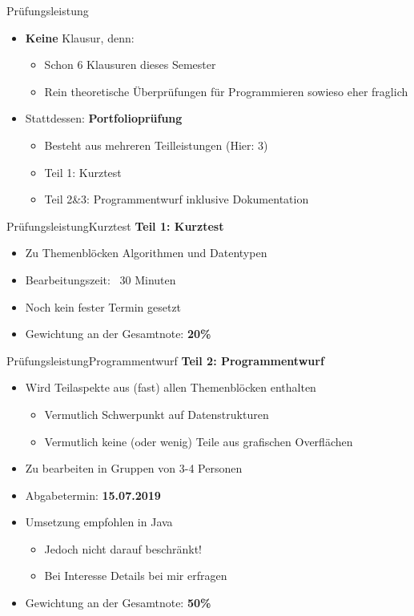 \begin{frame}{Prüfungsleistung}{}
	\begin{itemize}
	\item \textbf{Keine} Klausur, denn:
		\begin{itemize}
			\item Schon 6 Klausuren dieses Semester
			\item Rein theoretische Überprüfungen für Programmieren sowieso eher fraglich
		\end{itemize}
	\item Stattdessen: \textbf{Portfolioprüfung}
		\begin{itemize}
			\item Besteht aus mehreren Teilleistungen (Hier: 3)
			\item Teil 1: Kurztest
			\item Teil 2\&3: Programmentwurf inklusive Dokumentation 
		\end{itemize}
	\end{itemize}
\end{frame}

\begin{frame}{Prüfungsleistung}{Kurztest}
	\textbf{Teil 1: Kurztest}
	\begin{itemize}
		\item Zu Themenblöcken Algorithmen und Datentypen
		\item Bearbeitungszeit: ~30 Minuten
		\item Noch kein fester Termin gesetzt
		\item Gewichtung an der Gesamtnote: \textbf{20\%}
	\end{itemize}
\end{frame}

\begin{frame}{Prüfungsleistung}{Programmentwurf}
	\textbf{Teil 2: Programmentwurf}
	\begin{itemize}
		\item Wird Teilaspekte aus (fast) allen Themenblöcken enthalten
		\begin{itemize}
			\item Vermutlich Schwerpunkt auf Datenstrukturen
			\item Vermutlich keine (oder wenig) Teile aus grafischen Overflächen
		\end{itemize}
		\item Zu bearbeiten in Gruppen von 3-4 Personen
		\item Abgabetermin: \textbf{15.07.2019}
		\item Umsetzung empfohlen in Java
		\begin{itemize}
			\item Jedoch nicht darauf beschränkt!
			\item Bei Interesse Details bei mir erfragen
		\end{itemize}
		\item Gewichtung an der Gesamtnote: \textbf{50\%}
	\end{itemize}
\end{frame}

